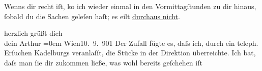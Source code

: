 \pstart
           Wenns dir recht iſt, ko{\geminationm} ich wieder {\pb}einmal in den
               Vormittagſtunden zu dir hinaus, ſobald du die Sachen geleſen haſt; es eilt \uline{durchaus nicht}.\pend
           
\pstart
           herzlich grüßt dich{\\[\baselineskip]}dein \spacefill\mbox{Arthur}\pend
           \leftskip=0em{}
\pstart
           Wien10. 9. 901\pend
           \vspace{1em}
\pstart
           \noindent{}Der Zufall fügte es, daſs ich, durch ein teleph. Erſuchen Kadelburgs veranlaſſt, die Stücke in der Direktion
               überreichte. Ich bat, daſs man ſie {\pb}dir zukommen ließe, was
               wohl bereits geſchehen iſt\pend
           
